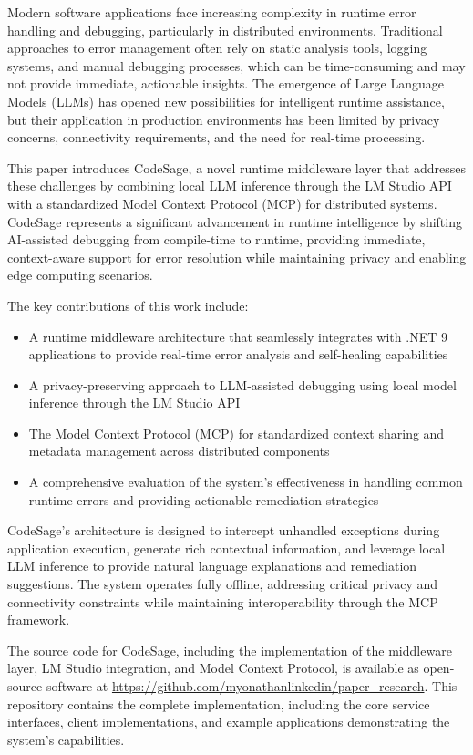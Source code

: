 Modern software applications face increasing complexity in runtime error handling and debugging, particularly in distributed environments. Traditional approaches to error management often rely on static analysis tools, logging systems, and manual debugging processes, which can be time-consuming and may not provide immediate, actionable insights. The emergence of Large Language Models (LLMs) has opened new possibilities for intelligent runtime assistance, but their application in production environments has been limited by privacy concerns, connectivity requirements, and the need for real-time processing.

This paper introduces CodeSage, a novel runtime middleware layer that addresses these challenges by combining local LLM inference through the LM Studio API with a standardized Model Context Protocol (MCP) for distributed systems. CodeSage represents a significant advancement in runtime intelligence by shifting AI-assisted debugging from compile-time to runtime, providing immediate, context-aware support for error resolution while maintaining privacy and enabling edge computing scenarios.

The key contributions of this work include:

\begin{itemize}
    \item A runtime middleware architecture that seamlessly integrates with .NET 9 applications to provide real-time error analysis and self-healing capabilities
    \item A privacy-preserving approach to LLM-assisted debugging using local model inference through the LM Studio API
    \item The Model Context Protocol (MCP) for standardized context sharing and metadata management across distributed components
    \item A comprehensive evaluation of the system's effectiveness in handling common runtime errors and providing actionable remediation strategies
\end{itemize}

CodeSage's architecture is designed to intercept unhandled exceptions during application execution, generate rich contextual information, and leverage local LLM inference to provide natural language explanations and remediation suggestions. The system operates fully offline, addressing critical privacy and connectivity constraints while maintaining interoperability through the MCP framework.

The source code for CodeSage, including the implementation of the middleware layer, LM Studio integration, and Model Context Protocol, is available as open-source software at \url{https://github.com/myonathanlinkedin/paper_research}. This repository contains the complete implementation, including the core service interfaces, client implementations, and example applications demonstrating the system's capabilities.

